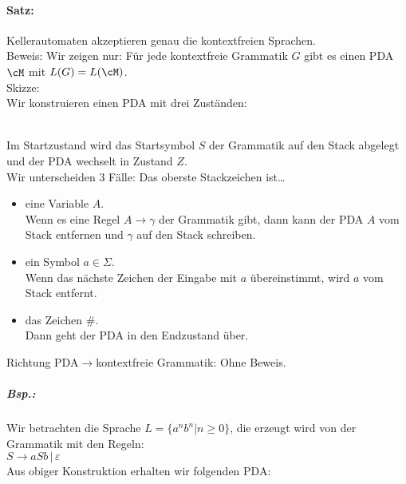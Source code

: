 \documentclass{scrreprt}
\begin{document}
\paragraph{Satz:} Kellerautomaten akzeptieren genau die kontextfreien Sprachen.\\
Beweis: Wir zeigen nur: Für jede kontextfreie Grammatik $G$ gibt es einen PDA $\cM$ mit $L(G)=L(\cM)$.\\
Skizze: \\
Wir konstruieren einen PDA mit drei Zuständen:\\
\\
Im Startzustand wird das Startsymbol $S$ der Grammatik auf den Stack abgelegt und der PDA wechselt in Zustand $Z$.\\
Wir unterscheiden 3 Fälle: Das oberste Stackzeichen ist…
\begin{itemize}
\item eine Variable $A$.\\
Wenn es eine Regel $A\to \gamma$ der Grammatik gibt, dann kann der PDA $A$ vom Stack entfernen und $\gamma$ auf den Stack schreiben.
\item ein Symbol $a\in \Sigma$.\\
Wenn das nächste Zeichen der Eingabe mit $a$ übereinstimmt, wird $a$ vom Stack entfernt.
\item das Zeichen $\#$.\\
Dann geht der PDA in den Endzustand über.
\end{itemize}
Richtung PDA$\to$kontextfreie Grammatik: Ohne Beweis.
\subparagraph{Bsp.:} Wir betrachten die Sprache $L=\{a^nb^n|n\geq 0\}$, die erzeugt wird von der Grammatik mit den Regeln:\\
$S\to aSb \,|\, \varepsilon$\\
Aus obiger Konstruktion erhalten wir folgenden PDA:\\
\\
\end{document}
